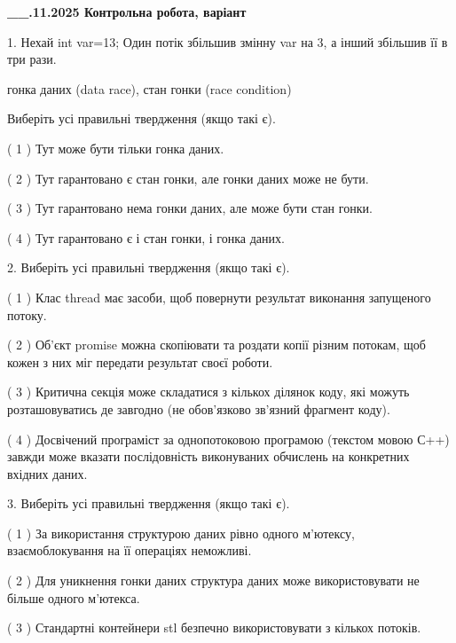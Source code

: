 \documentclass[12pt, ukrainian]{article}
\begin{document}
\newpage
\begin {large}

\textbf{\_\_.11.2025 Контрольна робота, варіант  }\par


{
1. Нехай int var=13; Один потік збільшив змінну var на 3, а інший збільшив її в три рази.

гонка даних (data race), стан гонки (race condition)

Виберіть усі правильні твердження (якщо такі є).\par
\vspace{2mm}
( 1 ) Тут може бути тільки гонка даних.%

( 2 ) Тут гарантовано є стан гонки, але гонки даних може не бути.%

( 3 ) Тут гарантовано нема гонки даних, але може бути стан гонки.%

( 4 ) Тут гарантовано є і стан гонки, і гонка даних.%


2. Виберіть усі правильні твердження (якщо такі є).\par
\vspace{2mm}

( 1 ) Клас thread має засоби, щоб повернути результат виконання запущеного потоку.%

( 2 ) Об’єкт promise можна скопіювати та роздати копії різним потокам, щоб кожен з них міг передати результат своєї роботи.%

( 3 ) Критична секція може складатися з кількох ділянок коду, які можуть розташовуватись де завгодно (не обов’язково зв’язний фрагмент коду).%

( 4 ) Досвічений програміст за однопотоковою програмою (текстом мовою С++) завжди може вказати послідовність виконуваних обчислень на конкретних вхідних даних.%


3. Виберіть усі правильні твердження (якщо такі є).\par
\vspace{2mm}

( 1 ) За використання структурою даних рівно одного м’ютексу, взаємоблокування на її операціях неможливі.%

( 2 ) Для уникнення гонки даних структура даних може використовувати не більше одного м’ютекса.%

( 3 ) Стандартні контейнери stl безпечно використовувати з кількох потоків.%

}
\end{large}
\end{document}
